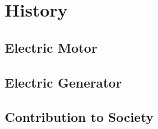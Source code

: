 \section{History}

    \subsection{Electric Motor}

    \subsection{Electric Generator}

    \subsection{Contribution to Society}
